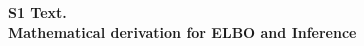 \documentclass[10pt,letterpaper]{article}
\date{}
\begin{document}
\vspace*{0.35in}

\begin{flushleft}
{\Large
\textbf{S1 Text. \\}
\bigskip
\textbf{Mathematical derivation for ELBO and Inference} %
}
\newline
\bigskip

%
%




\end{flushleft}
\end{document}
